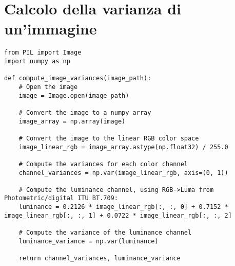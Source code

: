 \section{Calcolo della varianza di un'immagine}
\begin{verbatim}
from PIL import Image
import numpy as np

def compute_image_variances(image_path):
    # Open the image
    image = Image.open(image_path)

    # Convert the image to a numpy array
    image_array = np.array(image)

    # Convert the image to the linear RGB color space
    image_linear_rgb = image_array.astype(np.float32) / 255.0

    # Compute the variances for each color channel
    channel_variances = np.var(image_linear_rgb, axis=(0, 1))

    # Compute the luminance channel, using RGB->Luma from Photometric/digital ITU BT.709:
    luminance = 0.2126 * image_linear_rgb[:, :, 0] + 0.7152 * image_linear_rgb[:, :, 1] + 0.0722 * image_linear_rgb[:, :, 2]

    # Compute the variance of the luminance channel
    luminance_variance = np.var(luminance)

    return channel_variances, luminance_variance
\end{verbatim}
